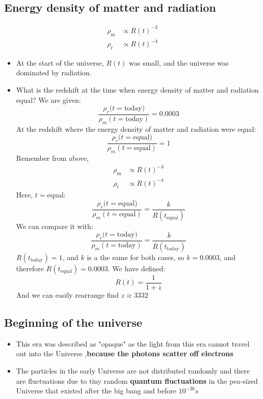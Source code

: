 \documentclass{article}
\begin{document}
\subsection{Energy density of matter and radiation}
\begin{align}
\rho_\text{m} &\propto {R(t)}^{-3}\\
\rho_\text{r} &\propto {R(t)}^{-4}
\end{align}
\begin{itemize}
\item At the start of the universe, $R(t)$ was small, and the universe was dominated by radiation.
\item What is the redshift at the time when energy density of matter and radiation equal? We are given:
\begin{equation}
    \frac{\rho_r(t=\text{today)}}{\rho_m(t=\text{today})}=0.0003
\end{equation}
At the redshift where the energy density of matter and radiation were equal:
\begin{equation}
 \frac{\rho_r(t=\text{equal)}}{\rho_m(t=\text{equal})}=1
\end{equation}
Remember from above,
\begin{align}
    \rho_\text{m} &\propto {R(t)}^{-3}\\
    \rho_\text{r} &\propto {R(t)}^{-4}
\end{align}
Here, $t=\text{equal}$:
\begin{equation}
\frac{\rho_r(t=\text{equal)}}{\rho_m(t=\text{equal})}=\frac{k}{R(t_\text{equal})}
\end{equation}
We can compare it with:
\begin{equation}
\frac{\rho_r(t=\text{today)}}{\rho_m(t=\text{today})}=\frac{k}{R(t_\text{today})}
\end{equation}
$R(t_\text{today})=1$, and $k$ is a the same for both cases, so $k=0.0003$, and therefore $R(t_\text{equal})=0.0003$.
We have defined:
\begin{equation}
    R(t)=\frac{1}{1+z}
\end{equation}
And we can easily rearrange find $z \approx 3332$
\end{itemize}
\subsection{Beginning of the universe}
\begin{itemize}
\item This era was described as "opaque" as the light from this era cannot travel out into the Universe ,\textbf{because the photons scatter off electrons}
\item The particles in the early Universe are not distributed randomly and
there are fluctuations due to tiny random \textbf{quantum fluctuations}
in the pea-sized Universe that existed after the big bang and before $10^{-30}s$
\end{itemize}
\end{document}
